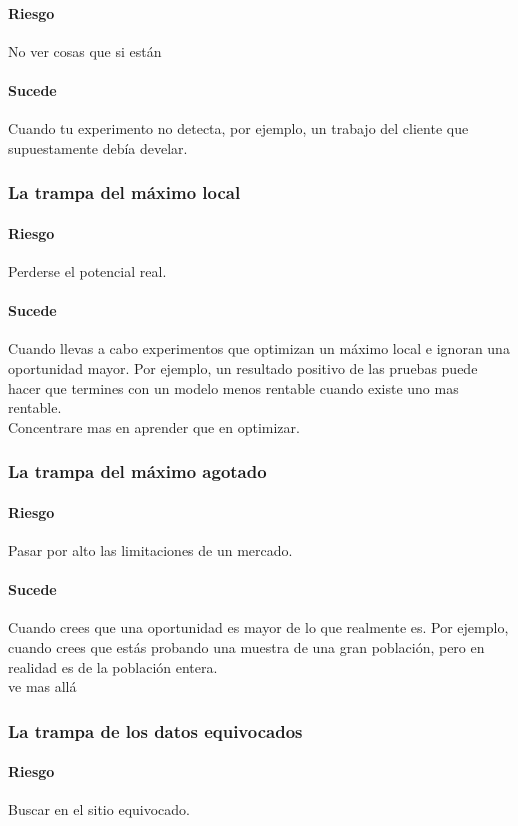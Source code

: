 \documentclass[11pt]{book}
\begin{document}
\paragraph{Riesgo} No ver cosas que si están
\paragraph{Sucede} Cuando tu experimento no detecta, por ejemplo, un trabajo del cliente que supuestamente debía develar.
\subsubsection{La trampa del máximo local}
\paragraph{Riesgo} Perderse el potencial real.
\paragraph{Sucede}
Cuando llevas a cabo experimentos que optimizan un máximo local e ignoran una oportunidad mayor. Por ejemplo, un resultado positivo de las pruebas puede hacer que termines con un modelo menos rentable cuando existe uno mas rentable.\\
Concentrare mas en aprender que en optimizar.
\subsubsection{La trampa del máximo agotado}
\paragraph{Riesgo}
Pasar por alto las limitaciones de un mercado.
\paragraph{Sucede}
Cuando crees que una oportunidad es mayor de lo que realmente es. Por ejemplo, cuando crees que estás probando una muestra de una gran población, pero en realidad es de la población entera.\\ ve mas allá
\subsubsection{La trampa de los datos equivocados}
\paragraph{Riesgo}Buscar en el sitio equivocado.
\end{document}
